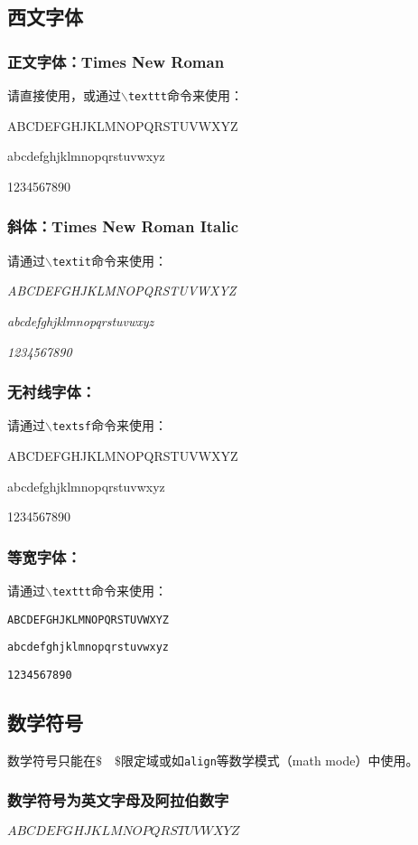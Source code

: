 \subsection{西文字体}

\subsubsection{正文字体：Times New Roman}
请直接使用，或通过\texttt{$\backslash$texttt}命令来使用：

ABCDEFGHJKLMNOPQRSTUVWXYZ 

abcdefghjklmnopqrstuvwxyz 

1234567890

\subsubsection{斜体：Times New Roman Italic}
请通过\texttt{$\backslash$textit}命令来使用：

\textit{ABCDEFGHJKLMNOPQRSTUVWXYZ}

\textit{abcdefghjklmnopqrstuvwxyz}

\textit{1234567890}

\subsubsection{无衬线字体：}
请通过\texttt{$\backslash$textsf}命令来使用：

\textsf{ABCDEFGHJKLMNOPQRSTUVWXYZ}

\textsf{abcdefghjklmnopqrstuvwxyz}

\textsf{1234567890}

\subsubsection{等宽字体：}
请通过\texttt{$\backslash$texttt}命令来使用：

\texttt{ABCDEFGHJKLMNOPQRSTUVWXYZ}

\texttt{abcdefghjklmnopqrstuvwxyz}

\texttt{1234567890}

\subsection{数学符号}
数学符号只能在$\$\quad\$$限定域或如\texttt{align}等数学模式（math mode）中使用。

\subsubsection{数学符号为英文字母及阿拉伯数字}
$ABCDEFGHJKLMNOPQRSTUVWXYZ$

